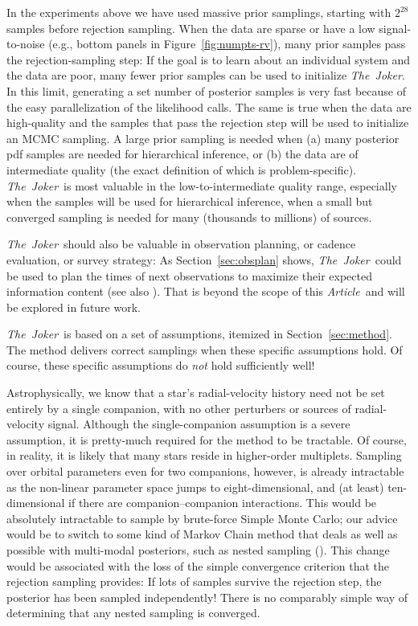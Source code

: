 \documentclass[manuscript, letterpaper]{aastex6}
\newcommand{\project}[1]{\textsl{#1}}
\newcommand{\samplername}{\project{The~Joker}}
\newcommand{\documentname}{\textsl{Article}}
\newcommand{\sectionname}{Section}
\newcommand{\figname}{Figure}
\newcommand{\resp}[1]{#1}
\begin{document}
In the experiments above we have used massive prior samplings, starting with
$2^{28}$ samples before rejection sampling.
When the data are sparse or have a low signal-to-noise (e.g., bottom panels in
\figname~\ref{fig:numpts-rv}), many prior samples pass the rejection-sampling
step:
If the goal is to learn about an individual system and the data are poor, many
fewer prior samples can be used to initialize \samplername.
\resp{In this limit, generating a set number of posterior samples is very fast
because of the easy parallelization of the likelihood calls.}
The same is true when the data are high-quality and the samples that pass the
rejection step will be used to initialize an MCMC sampling.
A large prior sampling is needed when (a) many posterior pdf samples are needed
for hierarchical inference, or (b) the data are of intermediate quality (the
exact definition of which is problem-specific).
\resp{\samplername\ is most valuable in the low-to-intermediate quality range,
especially when the samples will be used for hierarchical inference, when a
small but converged sampling is needed for many (thousands to millions) of
sources.}

\samplername\ should also be valuable in observation planning, or cadence
evaluation, or survey strategy:
As \sectionname~\ref{sec:obsplan} shows,
\samplername\ could be used to plan the times of next observations to maximize
their expected information content \resp{(see also
\citealt{Loredo:2004,Ford:2004})}.
That is beyond the scope of this \documentname\ and will be explored in future
work.

\samplername\ is based on a set of assumptions, itemized in
\sectionname~\ref{sec:method}.
The method delivers correct samplings when these specific assumptions hold.
Of course, these specific assumptions do \emph{not} hold sufficiently well!

Astrophysically, we know that a star's radial-velocity history
need not be set entirely by a single companion, with no other perturbers or
sources of radial-velocity signal.
Although the single-companion assumption is a severe assumption, it
is pretty-much required for the method to be tractable.
Of course, in reality, it is likely that many stars reside in higher-order
multiplets.
Sampling over orbital parameters even for two companions, however, is already
intractable as the non-linear parameter space jumps to eight-dimensional, and
(at least) ten-dimensional if there are companion--companion interactions.
This would be absolutely intractable to sample by brute-force Simple
Monte Carlo; our advice would be to switch to some kind of Markov
Chain method that deals as well as possible with multi-modal
posteriors, such as nested sampling (\citealt{Skilling:2004, Brewer:2009}).
This change would be associated with the loss of the simple
convergence criterion that the \resp{rejection sampling} provides:
If lots of samples survive the rejection step, the posterior has been sampled
\resp{independently}!
There is no comparably simple way of determining that any nested
sampling is converged.
\end{document}
